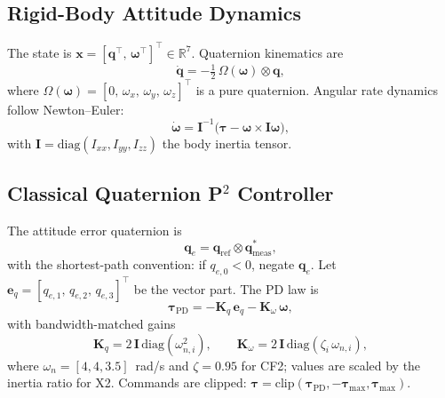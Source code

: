 \documentclass[conference]{IEEEtran}
\begin{document}
\subsection{Rigid-Body Attitude Dynamics}

The state is $\mathbf{x} = [\mathbf{q}^\top,\, \boldsymbol{\omega}^\top]^\top \in \mathbb{R}^7$.
Quaternion kinematics are
\begin{equation}
  \dot{\mathbf{q}} = -\tfrac{1}{2}\,\Omega(\boldsymbol{\omega}) \otimes \mathbf{q},
  \label{eq:qkin}
\end{equation}
where $\Omega(\boldsymbol{\omega}) = [0,\, \omega_x,\, \omega_y,\, \omega_z]^\top$ is
a pure quaternion.
Angular rate dynamics follow Newton--Euler:
\begin{equation}
  \dot{\boldsymbol{\omega}} = \mathbf{I}^{-1}
    \bigl(\boldsymbol{\tau} - \boldsymbol{\omega} \times \mathbf{I}\boldsymbol{\omega}\bigr),
  \label{eq:rbd}
\end{equation}
with $\mathbf{I} = \mathrm{diag}(I_{xx}, I_{yy}, I_{zz})$ the body inertia tensor.

\subsection{Classical Quaternion P\texorpdfstring{$^2$}{2} Controller}

The attitude error quaternion is
\begin{equation}
  \mathbf{q}_e = \mathbf{q}_{\mathrm{ref}} \otimes \mathbf{q}_{\mathrm{meas}}^*,
  \label{eq:qerr}
\end{equation}
with the shortest-path convention: if $q_{e,0} < 0$, negate $\mathbf{q}_e$.
Let $\mathbf{e}_q = [q_{e,1},\, q_{e,2},\, q_{e,3}]^\top$ be the vector part.
The PD law is
\begin{equation}
  \boldsymbol{\tau}_{\mathrm{PD}} =
    -\mathbf{K}_q\,\mathbf{e}_q - \mathbf{K}_\omega\,\boldsymbol{\omega},
  \label{eq:pd}
\end{equation}
with bandwidth-matched gains
\begin{equation}
  \mathbf{K}_q = 2\,\mathbf{I}\,\mathrm{diag}(\omega_{n,i}^2),
  \qquad
  \mathbf{K}_\omega = 2\,\mathbf{I}\,\mathrm{diag}(\zeta_i\,\omega_{n,i}),
  \label{eq:gains}
\end{equation}
where $\omega_n = [4,4,3.5]$~rad/s and $\zeta = 0.95$ for CF2;
values are scaled by the inertia ratio for X2.
Commands are clipped: $\boldsymbol{\tau} = \mathrm{clip}(\boldsymbol{\tau}_{\mathrm{PD}},
-\boldsymbol{\tau}_{\max}, \boldsymbol{\tau}_{\max})$.
\end{document}
